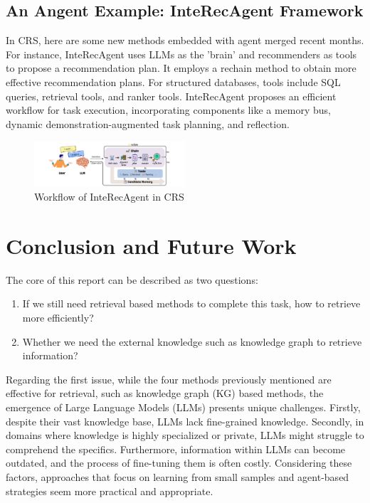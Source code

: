 \documentclass[11pt]{article}
\begin{document}
\subsection{An Angent Example: InteRecAgent Framework}
In CRS, here are some new methods embedded with agent merged recent months. For instance, InteRecAgent \citet{huang2023recommender} uses LLMs as the 'brain' and recommenders as tools to propose a recommendation plan. It employs a rechain method to obtain more effective recommendation plans. For structured databases, tools include SQL queries, retrieval tools, and ranker tools. InteRecAgent proposes an efficient workflow for task execution, incorporating components like a memory bus, dynamic demonstration-augmented task planning, and reflection.
\begin{figure}[ht]
\centering
\includegraphics[width=0.5\textwidth]{images/image-20231224163105301.png}
\caption{Workflow of InteRecAgent in CRS \citet{huang2023recommender}}
\end{figure}



\section{Conclusion and Future Work}
The core of this report can be described as two questions:

\begin{enumerate}
    \item If we still need retrieval based methods to complete this task, how to retrieve more efficiently?
    \item Whether we need the external knowledge such as knowledge graph to retrieve information?
\end{enumerate}

Regarding the first issue, while the four methods previously mentioned are effective for retrieval, such as knowledge graph (KG) based methods, the emergence of Large Language Models (LLMs) presents unique challenges. Firstly, despite their vast knowledge base, LLMs lack fine-grained knowledge. Secondly, in domains where knowledge is highly specialized or private, LLMs might struggle to comprehend the specifics. Furthermore, information within LLMs can become outdated, and the process of fine-tuning them is often costly. Considering these factors, approaches that focus on learning from small samples and agent-based strategies seem more practical and appropriate. \citet{huang2023recommender}
\end{document}
